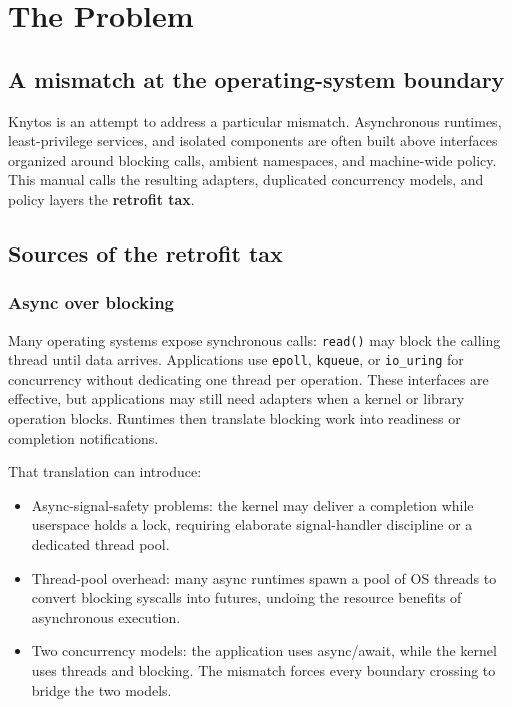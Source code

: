 \chapter{The Problem}
\label{chap:problem}

\section{A mismatch at the operating-system boundary}

Knytos is an attempt to address a particular mismatch. Asynchronous runtimes,
least-privilege services, and isolated components are often built above interfaces organized
around blocking calls, ambient namespaces, and machine-wide policy. This manual
calls the resulting adapters, duplicated concurrency models, and policy layers
the \textbf{retrofit tax}.

\section{Sources of the retrofit tax}

\subsection{Async over blocking}

Many operating systems expose synchronous calls: \texttt{read()} may block the
calling thread until data arrives. Applications use \texttt{epoll}, \texttt{kqueue},
or \texttt{io\_uring} for concurrency without dedicating one thread per operation.
These interfaces are effective, but applications may still need adapters when a
kernel or library operation blocks. Runtimes then translate blocking work into
readiness or completion notifications.

That translation can introduce:
\begin{itemize}
    \item Async-signal-safety problems: the kernel may deliver a
        completion while userspace holds a lock, requiring elaborate
        signal-handler discipline or a dedicated thread pool.
    \item Thread-pool overhead: many async runtimes spawn a pool of OS
        threads to convert blocking syscalls into futures, undoing the
        resource benefits of asynchronous execution.
    \item Two concurrency models: the application uses async/await, while the
        kernel uses threads and blocking. The mismatch forces every boundary
        crossing to bridge the two models.
\end{itemize}

